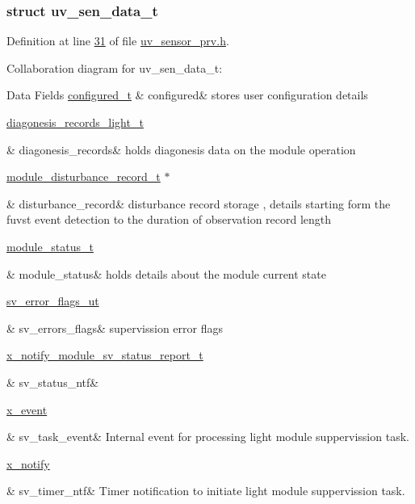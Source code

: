 \subsubsection{struct uv\+\_\+sen\+\_\+data\+\_\+t}


Definition at line \hyperlink{a00035_source_l00031}{31} of file \hyperlink{a00035_source}{uv\+\_\+sensor\+\_\+prv.\+h}.



Collaboration diagram for uv\+\_\+sen\+\_\+data\+\_\+t\+:
\begin{DoxyFields}{Data Fields}
\hypertarget{a00035_a94b2d1f6ea4ab334c74d24984dd27843}{\hyperlink{a00021_d6/d9c/a00352}{configured\+\_\+t}}\label{a00035_a94b2d1f6ea4ab334c74d24984dd27843}
&
configured&
stores user configuration details \\
\hline

\hypertarget{a00035_a7ae905b560513ad201e58c2f63375030}{\hyperlink{a00017_dd/dcb/a00375}{diagonesis\+\_\+records\+\_\+light\+\_\+t}}\label{a00035_a7ae905b560513ad201e58c2f63375030}
&
diagonesis\+\_\+records&
holds diagonesis data on the module operation \\
\hline

\hypertarget{a00035_ac9b38e2c1d3f1013a88d33506c754152}{\hyperlink{a00028}{module\+\_\+disturbance\+\_\+record\+\_\+t} $\ast$}\label{a00035_ac9b38e2c1d3f1013a88d33506c754152}
&
disturbance\+\_\+record&
disturbance record storage , details starting form the fuvst event detection to the duration of observation record length \\
\hline

\hypertarget{a00035_a5a53c391562b059eb744ac679f3765ca}{\hyperlink{a00017_de/d94/a00603}{module\+\_\+status\+\_\+t}}\label{a00035_a5a53c391562b059eb744ac679f3765ca}
&
module\+\_\+status&
holds details about the module current state \\
\hline

\hypertarget{a00035_aaeec6b0609dba31393f337abf1cce3d3}{\hyperlink{a00022_d2/d5a/a00792}{sv\+\_\+error\+\_\+flags\+\_\+ut}}\label{a00035_aaeec6b0609dba31393f337abf1cce3d3}
&
sv\+\_\+errors\+\_\+flags&
supervission error flags \\
\hline

\hypertarget{a00035_afdc0e2c51e8e301d264700f4f9c10740}{\hyperlink{a00021_d7/d1b/a00864}{x\+\_\+notify\+\_\+module\+\_\+sv\+\_\+status\+\_\+report\+\_\+t}}\label{a00035_afdc0e2c51e8e301d264700f4f9c10740}
&
sv\+\_\+status\+\_\+ntf&
\\
\hline

\hypertarget{a00035_a43c345f39ea3aefbb60ef1ef57fe5d83}{\hyperlink{a00036_de/d37/a00849}{x\+\_\+event}}\label{a00035_a43c345f39ea3aefbb60ef1ef57fe5d83}
&
sv\+\_\+task\+\_\+event&
Internal event for processing light module suppervission task. \\
\hline

\hypertarget{a00035_ada91b200053f2d93e3639dc4ee3415b4}{\hyperlink{a00036_df/d4c/a00851}{x\+\_\+notify}}\label{a00035_ada91b200053f2d93e3639dc4ee3415b4}
&
sv\+\_\+timer\+\_\+ntf&
Timer notification to initiate light module suppervission task. \\
\hline

\end{DoxyFields}


